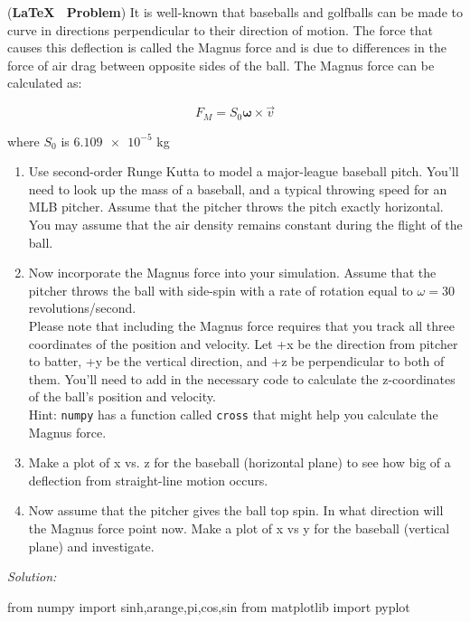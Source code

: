 \begin{enumerate}
\prob (\textbf{\LaTeX~ Problem}) It is well-known that baseballs and golfballs can be made to curve in
directions perpendicular to their direction of motion.  The force that
causes this deflection is called the Magnus force and is due to
differences in the force of air drag between opposite sides of the ball.  The
Magnus force can be calculated as:

\begin{equation}
F_M = S_0 \mathbf{\omega} \times \vec{v}
\end{equation}

where $S_0$ is $\num{6.109e-5}$ kg
\begin{enumerate}
\item Use second-order Runge Kutta to model a major-league baseball
  pitch.  You'll need to look up the mass of a baseball, and a typical
  throwing speed for an MLB pitcher.  Assume that the pitcher throws
  the pitch exactly horizontal.  You may assume that the air density
  remains constant during the flight of the ball.
\item Now incorporate the Magnus force into your simulation.  Assume
  that the pitcher throws the ball with side-spin with a rate of
  rotation equal to $\omega = 30 $ revolutions/second.  \\

  Please note that including the Magnus force requires that you track
  all three coordinates of the position and velocity. Let +x be the
  direction from pitcher to batter, +y be the vertical direction, and
  +z be perpendicular to both of them.  You'll
  need to add in the necessary code to calculate the z-coordinates of the ball's position and velocity.  \\

Hint: \texttt{numpy} has a
  function called \texttt{cross} that might help you calculate the
  Magnus force.
\item Make a plot of x vs. z for the baseball (horizontal
  plane) to see how big of a deflection from straight-line motion
  occurs.
\item Now assume that the pitcher gives the ball top spin.  In what
  direction will the Magnus force point now.  Make a
  plot of x vs y for the baseball (vertical plane) and investigate.  
\end{enumerate}
\ifsolutions
\textit{Solution:}\\
\begin{codeexample}
\begin{VerbatimOut}{\listingFile}
from numpy import sinh,arange,pi,cos,sin
from matplotlib import pyplot




\end{VerbatimOut}
\end{codeexample}
\end{enumerate}
